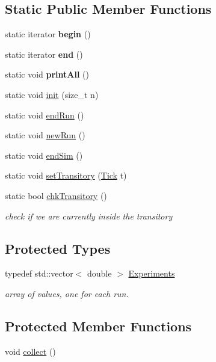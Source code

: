 \subsection*{Static Public Member Functions}
\begin{DoxyCompactItemize}
\item 
static iterator {\bfseries begin} ()
\item 
static iterator {\bfseries end} ()
\item 
static void {\bfseries print\+All} ()
\item 
static void \hyperlink{group__metasim__stat_gacde8a3231d53a08919f79f6e7de34f14}{init} (size\+\_\+t n)
\item 
static void \hyperlink{group__metasim__stat_gadf8350d5f8be46ce1ef72e24e4b68fdf}{end\+Run} ()
\item 
static void \hyperlink{group__metasim__stat_gaba33ca71604bba99e4204f0315079544}{new\+Run} ()
\item 
static void \hyperlink{group__metasim__stat_ga76adedc2cd26b03eae9274c628472c3b}{end\+Sim} ()
\item 
static void \hyperlink{group__metasim__stat_ga781ebbe2f6730a933ca4b950a40aa612}{set\+Transitory} (\hyperlink{classMetaSim_1_1Tick}{Tick} t)
\item 
static bool \hyperlink{group__metasim__stat_ga056cb5982708aff3ee784116e01b4e46}{chk\+Transitory} ()
\begin{DoxyCompactList}\small\item\em check if we are currently inside the transitory \end{DoxyCompactList}\end{DoxyCompactItemize}
\subsection*{Protected Types}
\begin{DoxyCompactItemize}
\item 
typedef std\+::vector$<$ double $>$ \hyperlink{group__metasim__stat_ga2bae1d8abdacdd19f279cba4b73f4b7e}{Experiments}
\begin{DoxyCompactList}\small\item\em array of values, one for each run. \end{DoxyCompactList}\end{DoxyCompactItemize}
\subsection*{Protected Member Functions}
\begin{DoxyCompactItemize}
\item 
void \hyperlink{group__metasim__stat_gac2088baeeca5cfd9d8b6393831118e98}{collect} ()
\end{DoxyCompactItemize}
